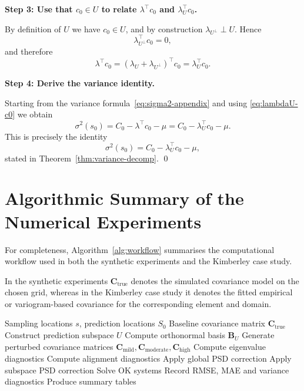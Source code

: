 \documentclass[smallextended]{svjour3}
\newcommand{\1}{\mathbf{1}}
\begin{document}
\medskip
\noindent\textbf{Step 3: Use that $c_0 \in U$ to relate $\lambda^\top c_0$ and $\lambda_U^\top c_0$.}

By definition of $U$ we have $c_0 \in U$, and by construction
$\lambda_{U^\perp} \perp U$. Hence
\[
\lambda_{U^\perp}^\top c_0 = 0,
\]
and therefore
\begin{equation}
	\label{eq:lambdaU-c0}
	\lambda^\top c_0
	= (\lambda_U + \lambda_{U^\perp})^\top c_0
	= \lambda_U^\top c_0.
\end{equation}

\medskip
\noindent\textbf{Step 4: Derive the variance identity.}

Starting from the variance formula~\eqref{eq:sigma2-appendix} and using
\eqref{eq:lambdaU-c0} we obtain
\[
\sigma^2(s_0)
= C_0 - \lambda^\top c_0 - \mu
= C_0 - \lambda_U^\top c_0 - \mu.
\]
This is precisely the identity
\[
\sigma^2(s_0) = C_0 - \lambda_U^\top c_0 - \mu,
\]
stated in Theorem~\ref{thm:variance-decomp}. \qed
	
	\clearpage
\section{Algorithmic Summary of the Numerical Experiments}
\label{app:algorithms}

For completeness, Algorithm~\ref{alg:workflow} 	summarises the computational workflow used in both the synthetic
experiments and the Kimberley case study.

In the synthetic experiments $\mathbf C_{\mathrm{true}}$ denotes the simulated covariance model on the chosen grid, whereas in the Kimberley case study it denotes the fitted empirical or variogram-based covariance for the corresponding element and domain.


\begin{algorithm}[htbp]
	\caption{Evaluation of indefinite covariance structures}
	\label{alg:workflow}
	\begin{algorithmic}[1]
		\Require Sampling locations $s$, prediction locations $S_0$
		\Require Baseline covariance matrix $\mathbf C_{\mathrm{true}}$
		\State Construct prediction subspace $U$
		\State Compute orthonormal basis $\mathbf B_U$
		\State Generate perturbed covariance matrices
		$\mathbf C_{\mathrm{mild}},
		\mathbf C_{\mathrm{moderate}},
		\mathbf C_{\mathrm{high}}$
		\State Compute eigenvalue diagnostics
		\State Compute alignment diagnostics
		\State Apply global PSD correction
		\State Apply subspace PSD correction
		\State Solve OK systems
		\State Record RMSE, MAE and variance diagnostics
		\EndFor
		\State Produce summary tables
	\end{algorithmic}
\end{algorithm}
\end{document}
